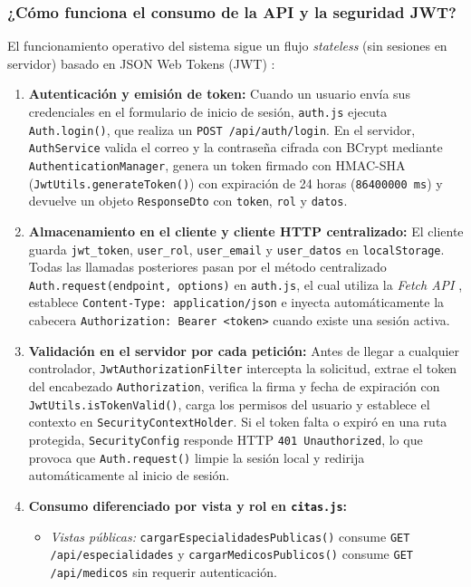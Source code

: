 \documentclass{article}
\begin{document}
\subsubsection{¿Cómo funciona el consumo de la API y la seguridad JWT?}
El funcionamiento operativo del sistema sigue un flujo \textit{stateless} (sin sesiones en servidor) basado en JSON Web Tokens (JWT) \cite{rfc7519}:

\begin{enumerate}
    \item \textbf{Autenticación y emisión de token:} Cuando un usuario envía sus credenciales en el formulario de inicio de sesión, \texttt{auth.js} ejecuta \texttt{Auth.login()}, que realiza un \texttt{POST /api/auth/login}. En el servidor, \texttt{AuthService} valida el correo y la contraseña cifrada con BCrypt mediante \texttt{AuthenticationManager}, genera un token firmado con HMAC-SHA (\texttt{JwtUtils.generateToken()}) con expiración de 24 horas (\texttt{86400000 ms}) y devuelve un objeto \texttt{ResponseDto} con \texttt{token}, \texttt{rol} y \texttt{datos}.
    \item \textbf{Almacenamiento en el cliente y cliente HTTP centralizado:} El cliente guarda \texttt{jwt\_token}, \texttt{user\_rol}, \texttt{user\_email} y \texttt{user\_datos} en \texttt{localStorage}. Todas las llamadas posteriores pasan por el método centralizado \texttt{Auth.request(endpoint, options)} en \texttt{auth.js}, el cual utiliza la \textit{Fetch API} \cite{mdnfetch}, establece \texttt{Content-Type: application/json} e inyecta automáticamente la cabecera \texttt{Authorization: Bearer <token>} cuando existe una sesión activa.
    \item \textbf{Validación en el servidor por cada petición:} Antes de llegar a cualquier controlador, \texttt{JwtAuthorizationFilter} intercepta la solicitud, extrae el token del encabezado \texttt{Authorization}, verifica la firma y fecha de expiración con \texttt{JwtUtils.isTokenValid()}, carga los permisos del usuario y establece el contexto en \texttt{SecurityContextHolder}. Si el token falta o expiró en una ruta protegida, \texttt{SecurityConfig} responde HTTP \texttt{401 Unauthorized}, lo que provoca que \texttt{Auth.request()} limpie la sesión local y redirija automáticamente al inicio de sesión.
    \item \textbf{Consumo diferenciado por vista y rol en \texttt{citas.js}:}
    \begin{itemize}
        \item \textit{Vistas públicas:} \texttt{cargarEspecialidadesPublicas()} consume \texttt{GET /api/especialidades} y \texttt{cargarMedicosPublicos()} consume \texttt{GET /api/medicos} sin requerir autenticación.

\end{itemize}
\end{enumerate}
\end{document}
